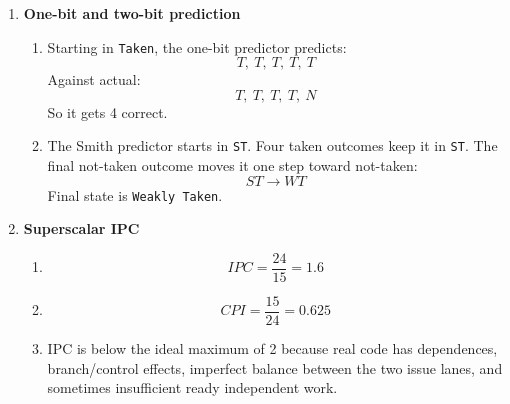 \documentclass[11pt]{article}
\begin{document}
\begin{enumerate}[label=\textbf{B\arabic*.}]
  \item \textbf{One-bit and two-bit prediction}
  \begin{enumerate}[label=(\alph*)]
    \item Starting in \texttt{Taken}, the one-bit predictor predicts:
    \[
      T,\ T,\ T,\ T,\ T
    \]
    Against actual:
    \[
      T,\ T,\ T,\ T,\ N
    \]
    So it gets 4 correct.
    \item The Smith predictor starts in \texttt{ST}. Four taken outcomes keep it in \texttt{ST}. The final not-taken outcome moves it one step toward not-taken:
    \[
      ST \rightarrow WT
    \]
    Final state is \texttt{Weakly Taken}.
  \end{enumerate}

  \item \textbf{Superscalar IPC}
  \begin{enumerate}[label=(\alph*)]
    \item
    \[
      IPC = \frac{24}{15} = 1.6
    \]
    \item
    \[
      CPI = \frac{15}{24} = 0.625
    \]
    \item IPC is below the ideal maximum of 2 because real code has dependences, branch/control effects, imperfect balance between the two issue lanes, and sometimes insufficient ready independent work.
  \end{enumerate}
\end{enumerate}
\end{document}
